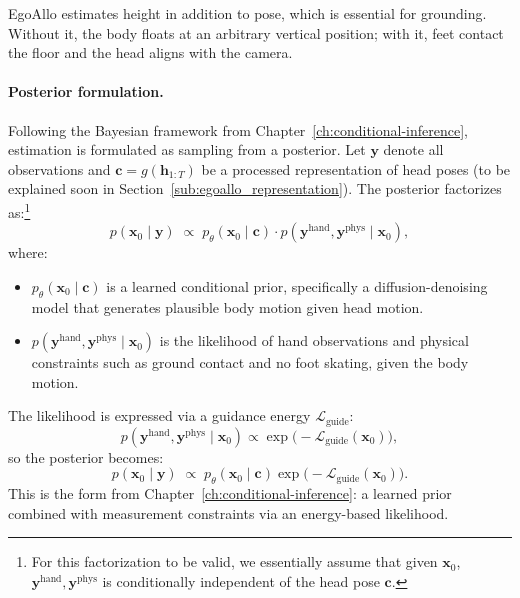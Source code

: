 \documentclass[../../book-main.tex]{subfiles}
\begin{document}
EgoAllo estimates height in addition to pose, which is essential for
grounding. Without it, the body floats at an arbitrary vertical
position; with it, feet contact the floor and the head aligns with the camera.

\paragraph{Posterior formulation.}
Following the Bayesian framework from
Chapter~\ref{ch:conditional-inference}, estimation is formulated as
sampling from a posterior. Let $\boldsymbol{y}$ denote all observations
and $\boldsymbol{c} = g(\boldsymbol{h}_{1:T})$ be a processed representation of
head poses (to be explained soon in
Section~\ref{sub:egoallo_representation}). The posterior factorizes
as:\footnote{For this factorization to be valid, we essentially
assume that given $\boldsymbol{x}_0$, $\boldsymbol{y}^{\text{hand}},
\boldsymbol{y}^{\text{phys}}$ is conditionally independent of the head
pose $\boldsymbol{c}$.}
\begin{equation}
p(\boldsymbol{x}_0 \mid \boldsymbol{y}) \;\propto\;
p_\theta(\boldsymbol{x}_0 \mid
\boldsymbol{c}) \cdot p(\boldsymbol{y}^{\text{hand}},
\boldsymbol{y}^{\text{phys}} \mid \boldsymbol{x}_0),
\end{equation}
where:
\begin{itemize}
\item $p_\theta(\boldsymbol{x}_0 \mid \boldsymbol{c})$ is a learned conditional
prior, specifically a diffusion-denoising model that
generates plausible body motion given head motion.
\item $p(\boldsymbol{y}^{\text{hand}}, \boldsymbol{y}^{\text{phys}} \mid
\boldsymbol{x}_0)$ is the likelihood of hand observations and
physical constraints such as ground contact and no foot
skating, given the body motion.
\end{itemize}

The likelihood is expressed via a guidance energy $\mathcal{L}_{\text{guide}}$:
\begin{equation}
p(\boldsymbol{y}^{\text{hand}}, \boldsymbol{y}^{\text{phys}} \mid
\boldsymbol{x}_0) \propto
\exp\big(-\mathcal{L}_{\text{guide}}(\boldsymbol{x}_0)\big),
\end{equation}
so the posterior becomes:
\begin{equation}
\label{eq:egoallo_posterior}
p(\boldsymbol{x}_0 \mid \boldsymbol{y}) \;\propto\;
p_\theta(\boldsymbol{x}_0 \mid
\boldsymbol{c}) \exp\big(-\mathcal{L}_{\text{guide}}(\boldsymbol{x}_0)\big).
\end{equation}
This is the form from Chapter~\ref{ch:conditional-inference}: a
learned prior combined with measurement constraints via an
energy-based likelihood.
\end{document}
